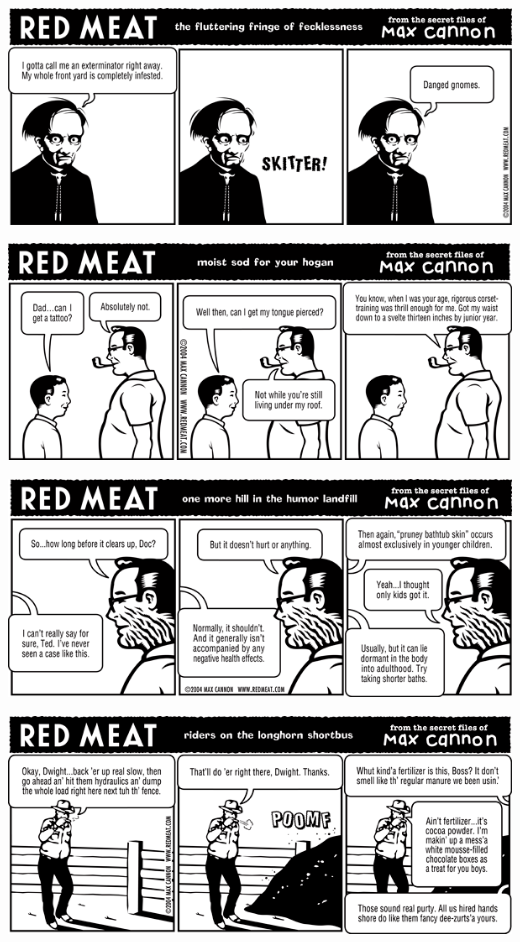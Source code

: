 \documentclass[a4paper,twoside,11pt]{article}
\begin{document}
\includegraphics[width=\textwidth]{redmeat_2004-05-11.png}



\includegraphics[width=\textwidth]{redmeat_2004-05-18.png}



\includegraphics[width=\textwidth]{redmeat_2004-05-25.png}



\includegraphics[width=\textwidth]{redmeat_2004-06-01.png}
\end{document}
